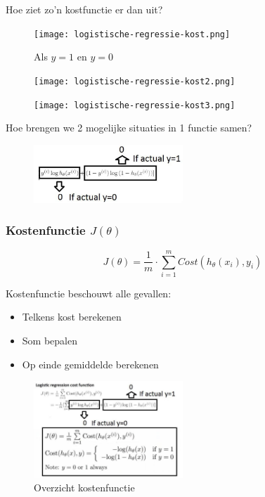 \documentclass{article}
\begin{document}
Hoe ziet zo'n kostfunctie er dan uit?

\begin{figure}[H]
    \centering
    \texttt{[image: logistische-regressie-kost.png]}
    \caption{Als $y = 1$ en $y = 0$}
\end{figure}

\begin{figure}[H]
    \centering
    \texttt{[image: logistische-regressie-kost2.png]}
\end{figure}

\begin{figure}[H]
    \centering
    \texttt{[image: logistische-regressie-kost3.png]}
\end{figure}

Hoe brengen we 2 mogelijke situaties in 1 functie samen?

\begin{figure}[H]
    \centering
    \includegraphics[width=0.5\textwidth]{logistische-regressie-2situaties.png}
    \caption{}
\end{figure}

\subsubsection{Kostenfunctie $J(\theta)$}

\begin{equation}
    J(\theta) = \frac{1}{m} \cdot \sum_{i=1}^m Cost(h_{\theta}(x_i), y_i)
\end{equation}

Kostenfunctie beschouwt alle gevallen:

\begin{itemize}
    \item Telkens kost berekenen
    \item Som bepalen
    \item Op einde gemiddelde berekenen
\end{itemize}

\begin{figure}[H]
    \centering
    \includegraphics[width=0.5\textwidth]{logistische-regressie-kost-overzicht.png}
    \caption{Overzicht kostenfunctie}
\end{figure}
\end{document}
